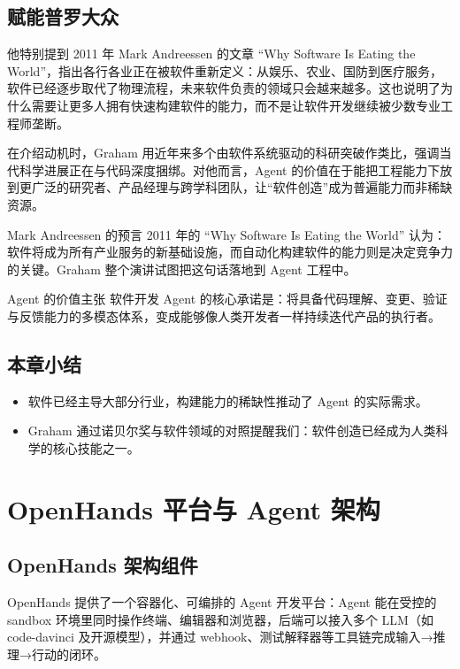\documentclass[a4paper]{article}
\begin{document}
\subsection{赋能普罗大众}
他特别提到 2011 年 Mark Andreessen 的文章 ``Why Software Is Eating the World''，指出各行各业正在被软件重新定义：从娱乐、农业、国防到医疗服务，软件已经逐步取代了物理流程，未来软件负责的领域只会越来越多。这也说明了为什么需要让更多人拥有快速构建软件的能力，而不是让软件开发继续被少数专业工程师垄断。

在介绍动机时，Graham 用近年来多个由软件系统驱动的科研突破作类比，强调当代科学进展正在与代码深度捆绑。对他而言，Agent 的价值在于能把工程能力下放到更广泛的研究者、产品经理与跨学科团队，让“软件创造”成为普遍能力而非稀缺资源。

\begin{knowledgebox}{Mark Andreessen 的预言}
2011 年的 ``Why Software Is Eating the World'' 认为：软件将成为所有产业服务的新基础设施，而自动化构建软件的能力则是决定竞争力的关键。Graham 整个演讲试图把这句话落地到 Agent 工程中。
\end{knowledgebox}

\begin{importantbox}{Agent 的价值主张}
软件开发 Agent 的核心承诺是：将具备代码理解、变更、验证与反馈能力的多模态体系，变成能够像人类开发者一样持续迭代产品的执行者。
\end{importantbox}

\subsection{本章小结}
\begin{itemize}
    \item 软件已经主导大部分行业，构建能力的稀缺性推动了 Agent 的实际需求。
    \item Graham 通过诺贝尔奖与软件领域的对照提醒我们：软件创造已经成为人类科学的核心技能之一。
\end{itemize}

\section{OpenHands 平台与 Agent 架构}
\subsection{OpenHands 架构组件}
OpenHands 提供了一个容器化、可编排的 Agent 开发平台：Agent 能在受控的 sandbox 环境里同时操作终端、编辑器和浏览器，后端可以接入多个 LLM（如 code-davinci 及开源模型），并通过 webhook、测试解释器等工具链完成输入→推理→行动的闭环。
\end{document}
